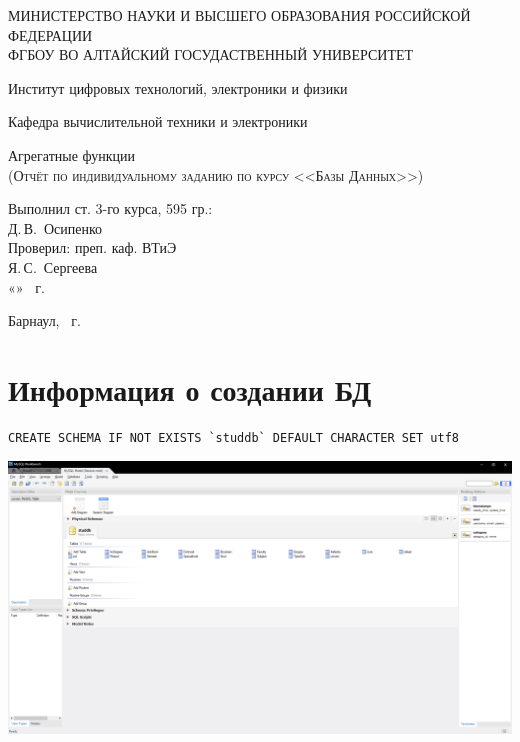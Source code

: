 \documentclass[a4paper, 12pt]{article}
\begin{document}
\begin{titlepage}
  \begin{center}
    \MakeUppercase{Министерство науки и высшего образования Российской Федерации} \\
    \MakeUppercase{ФГБОУ ВО Алтайский госудаственный университет}
    \vspace{0.25cm}
    
	  Институт цифровых технологий, электроники и физики
    
    Кафедра вычислительной техники и электроники
    \vfill
    
    {\LARGE Агрегатные функции}\\[5mm]
    \textsc{(Отчёт по индивидуальному заданию по курсу <<Базы Данных>>)}
  \bigskip

\end{center}
\vfill

\newlength{\ML}
\hfill
\begin{minipage}{0.45\textwidth}
  Выполнил ст. 3-го курса, 595 гр.:\\
  \underline{\hspace{\ML}} Д.\,В.~Осипенко\\
  Проверил: преп. каф. ВТиЭ\\
  \underline{\hspace{\ML}} Я.\,С.~Сергеева\\
  «\underline{\hspace{0.7cm}}» \underline{\hspace{2cm}} \the\year~г.
\end{minipage}%
\vfill

\begin{center}
  Барнаул, \the\year~г.
\end{center}
\end{titlepage}
\tableofcontents
\newpage

\section{Информация о создании БД}
\begin{lstlisting}
CREATE SCHEMA IF NOT EXISTS `studdb` DEFAULT CHARACTER SET utf8 
\end{lstlisting}
\includegraphics[width=\textwidth]{1.png}
\end{document}
